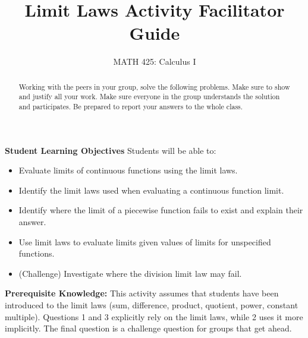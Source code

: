 \documentclass{ximera}
\title{Limit Laws Activity Facilitator Guide}
\author{MATH 425: Calculus I}
\begin{document}
\begin{abstract}
    Working with the peers in your group, solve the following problems. Make sure to show and justify all your work. Make sure everyone in the group understands the solution and participates. Be prepared to report your answers to the whole class. 
\end{abstract}
\maketitle

\textbf{Student Learning Objectives}
Students will be able to:
  \begin{itemize}
    \item Evaluate limits of continuous functions using the limit laws.
    \item Identify the limit laws used when evaluating a continuous function limit.
    \item Identify where the limit of a piecewise function fails to exist and explain their answer.
    \item Use limit laws to evaluate limits given values of limits for unspecified functions.
    \item (Challenge) Investigate where the division limit law may fail.
  \end{itemize}

\textbf{Prerequisite Knowledge:} This activity assumes that students have been introduced to the limit laws (sum, difference, product, quotient, power, constant multiple). Questions 1 and 3 explicitly rely on the limit laws, while 2 uses it more implicitly.  The final question is a challenge question for groups that get ahead. 
\end{document}
